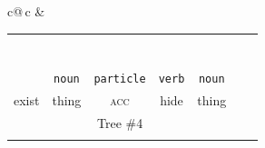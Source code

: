 \documentclass[a4paper,landscape,headrule,footrule,dvips]{foils}
\newcommand{\sa}[2]{\rnode{c#1}{\iz{#2}}}%
\begin{document}
\begin{CJK}{UTF8}{min}
{\begin{tabular}{c@{\,}c}
&
  \begin{tabular}{ccccccc}
    &\multicolumn{5}{c}{\sa{1}{NP-frag}}  \\[1ex]
    &\multicolumn{5}{c}{\sa{2}{\wl{rel-clause}}}  \\[1ex]
    &\multicolumn{3}{c}{\sa{3}{hd-complement}} & \sa{4}{N} \\[1ex]
    \multicolumn{3}{c}{\sa{5}{hd-complement}} & \multicolumn{1}{c}{\sa{J}{\wl{subj-zpro}}} &
    \\[1ex]
    \multicolumn{2}{c}{\sa{I}{\ul{rel-cl-sbj-gap}}} & & \sa{K}{V} &  & \\[1ex]
    \sa{H}{V} & \sa{7}{N}      & \sa{8}{CASE-P} &   &  \\[1ex]
    \sa{G}{ある} & \sa{B}{物事} & \sa{C}{を} & \sa{D}{隠す} &  \sa{F}{ 物} \\
   \texttt{\emp{\ul{verb}}} & \texttt{noun} & \texttt{particle} & \texttt{verb} & \texttt{noun} \\
    exist & thing &  \textsc{acc} & hide &  thing \\
   \multicolumn{5}{c}{Tree \#4} \\ \\
  \end{tabular}
   
   
   
    
   
   
    



\end{tabular}}
\end{CJK}
\end{document}
